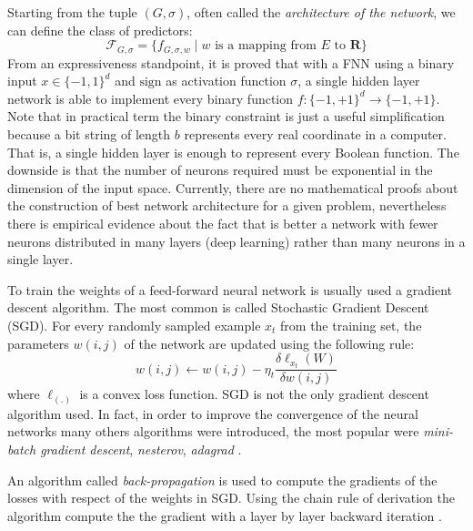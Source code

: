 Starting from the tuple $(G, \sigma)$, often called the \emph{architecture of the network}, we can define the class of predictors: 
\[ \mathcal{F}_{G, \sigma} = \{ f_{G, \sigma, w} \mid w \textrm{ is a mapping from } E \textrm{ to } \mathbf R \} \]
From an expressiveness standpoint, it is proved that with a FNN using a binary input $x \in \{-1, 1\}^d$ and $\mathrm{sign}$ as activation
function $\sigma$, a single hidden layer network is able to
implement every binary function $f: \{-1, +1\}^d \to \{-1, +1\}$. Note that in practical term the binary constraint is just a useful simplification because a bit string of length $b$ represents every real coordinate in a computer.  That is, a single hidden layer is
enough to represent every Boolean function. The downside is that
the number of neurons required must be exponential in the dimension
of the input space. Currently, there are no mathematical proofs about the construction of
best network architecture for a given problem, nevertheless there is empirical evidence
about the fact that is better a network with fewer neurons distributed in many layers (deep
learning) rather than many neurons in a single layer. %

To train the weights of a feed-forward neural network is usually
used a gradient descent algorithm. The most common is called
Stochastic Gradient Descent (SGD). For every randomly sampled
example $x_t$ from the training set, the parameters $w(i, j)$ of the
network are updated using the following rule:
\begin{equation} \label{eq:sgd} 
w(i, j) \leftarrow w(i, j) -  \eta_t \frac{\delta\ell_{x_t}(W)}{\delta w(i, j )}
\end{equation}
where $\ell_(.)$ is a convex loss function. SGD is not the only
gradient descent algorithm used. In fact, in order to
improve the convergence of the neural networks many others algorithms were introduced,
the most popular were \emph{mini-batch gradient descent}, \emph{nesterov}, \emph{adagrad}
\cite{RuderGDOpt}. 

An algorithm called \emph{back-propagation} is used to compute the
gradients of the losses with respect of the weights in SGD. Using the chain rule of derivation the algorithm compute the the gradient with a layer by layer backward iteration
\cite{HintonBackProp}.
 

